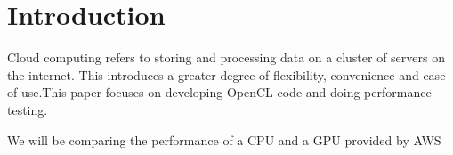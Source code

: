 \section{Introduction}
Cloud computing refers to storing and processing data on a cluster of servers on the internet. This introduces a greater degree of flexibility, convenience and ease of use.This paper focuses on developing OpenCL code and doing performance testing.

We will be comparing the performance of a CPU and a GPU provided by AWS


